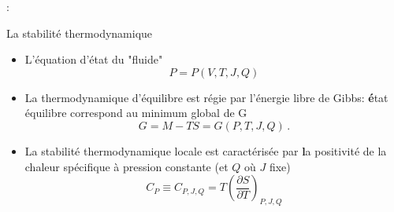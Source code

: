 \begin{frame}{\underline{\secname} : {\small \subsecname}}
\begin{block}{La stabilité thermodynamique}

\begin{itemize}
	\item  L'équation d'état du "fluide" 
\begin{equation*}
P=P(V,T,J,Q)
\end{equation*}
\item La thermodynamique d'équilibre est régie par l'énergie libre de Gibbs: {\color{green}\textbf état équilibre correspond au minimum global de G}
\begin{equation*}
G=M-TS=G(P,T,J, Q)\,. 
\end{equation*}
\item La stabilité thermodynamique locale est caractérisée par {\color{green}\textbf la positivité de la chaleur spécifique} à pression constante (et $Q$ où $J$ fixe) 
\begin{equation*}
C_P\equiv C_{P,J,Q}=T\left(\frac{\partial S}{\partial T}\right)_{P,J,Q}
\end{equation*}	

\end{itemize}	
	\end{block}
	

\end{frame}
